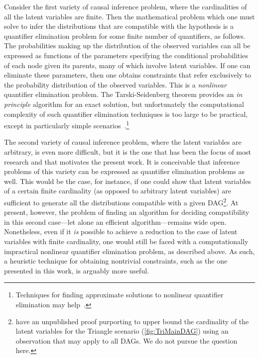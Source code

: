 \documentclass[aps,english,superscriptaddress,onecolumn,twoside,longbibliography,pra,floatfix,fleqn,nofootinbib]{revtex4-1}%
\theoremstyle{definition}
\begin{document}
Consider the first variety of causal inference problem, where the cardinalities of all the latent variables are finite. Then the mathematical problem which one must solve to infer the distributions that are compatible with the hypothesis is a quantifier elimination problem for some finite number of quantifiers, as follows. The probabilities making up the distribution of the observed variables can all be expressed as functions of the parameters specifying the conditional probabilities of each node given its parents, many of which involve latent variables. If one can eliminate these 
parameters, then one obtains constraints that refer exclusively to the probability distribution of the observed variables.  This is a {\em nonlinear} quantifier elimination problem. The Tarski-Seidenberg theorem provides an \emph{in principle} algorithm for an exact solution, but unfortunately the computational complexity of such quantifier elimination techniques is too large to be practical, except in particularly simple scenarios~\cite{LeeSpekkens}.\footnote{Techniques for finding approximate solutions to nonlinear quantifier elimination may help~\cite{ChavesPolynomial}.}

The second variety of causal inference problem, where the latent variables are arbitrary, is even more difficult, but it is the one that has been the focus of most research and that motivates the present work. It is conceivable that inference problems of this variety can be expressed as quantifier elimination problems as well. This would be the case, for instance, if one could show that latent variables of a certain finite cardinality (as opposed to arbitrary latent variables) are sufficient to generate all the distributions compatible with a given DAG\footnote{\citet{rosset2016finite} have an unpublished proof purporting to upper bound the cardinality of the latent variables for the Triangle scenario (\cref{fig:TriMainDAG}) using an observation that may apply to all DAGs. We do not pursue the question here.}. At present, however, the problem of finding an algorithm for deciding compatibility in this second case---let alone an efficient algorithm---remains wide open.  Nonetheless, even if it {\em is} possible to achieve a reduction to the case of latent variables with finite cardinality, one would still be faced with a computationally impractical nonlinear quantifier elimination problem, as described above. As such, a heuristic technique for obtaining nontrivial constraints, such as the one presented in this work, is arguably more useful.  
\end{document}
